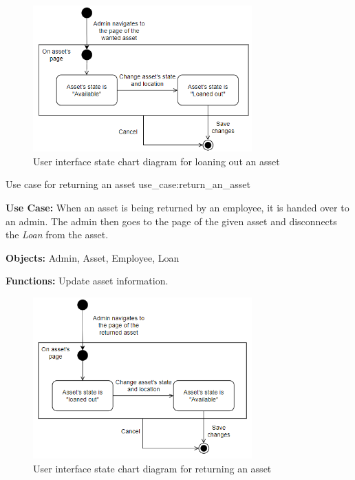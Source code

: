 \begin{figure}[H]
    \centering
    \includegraphics[width=0.75\textwidth]{figures/UseCases/LoanOutAssetUseCase.png}
    \caption{User interface state chart diagram for loaning out an asset}
    \label{fig:loan_out_asse_statechart}
\end{figure}

\newpage
 
    {Use case for returning an asset}
    {use_case:return_an_asset}
    {
        \textbf{Use Case:} When an asset is being returned by an employee, it is handed over to an admin. The admin then goes to the page of the given asset and disconnects the \textit{Loan} from the asset.
    
        \vskip 0.2cm
        
        \textbf{Objects:} Admin, Asset, Employee, Loan
        
        \vskip 0.2cm
        
        \textbf{Functions:} Update asset information.
    }
    
\begin{figure}[H]
    \centering
    \includegraphics[width=0.75\textwidth]{figures/UseCases/ReturnAssetUseCase.png}
    \caption{User interface state chart diagram for returning an asset}
    \label{fig:return_asset_statechart}
\end{figure}

